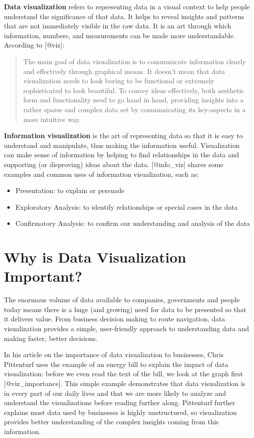 \documentclass[]{book}
\providecommand{\tightlist}{%
  \setlength{\itemsep}{0pt}\setlength{\parskip}{0pt}}
\theoremstyle{definition}
\theoremstyle{definition}
\theoremstyle{definition}
\theoremstyle{remark}
\begin{document}
\textbf{Data visualization} refers to representing data in a visual
context to help people understand the significance of that data. It
helps to reveal insights and patterns that are not immediately visible
in the raw data. It is an art through which information, numbers, and
measurements can be made more understandable. According to {[}@viz{]}:

\begin{quote}
The main goal of data visualization is to communicate information
clearly and effectively through graphical means. It doesn't mean that
data visualization needs to look boring to be functional or extremely
sophisticated to look beautiful. To convey ideas effectively, both
aesthetic form and functionality need to go hand in hand, providing
insights into a rather sparse and complex data set by communicating its
key-aspects in a more intuitive way.
\end{quote}

\textbf{Information visualization} is the art of representing data so
that it is easy to understand and manipulate, thus making the
information useful. Visualization can make sense of information by
helping to find relationships in the data and supporting (or disproving)
ideas about the data. {[}@info\_viz{]} shares some examples and common
uses of information visualization, such as:

\begin{itemize}
\tightlist
\item
  Presentation: to explain or persuade
\item
  Exploratory Analysis: to identify relationships or special cases in
  the data
\item
  Confirmatory Analysis: to confirm our understanding and analysis of
  the data
\end{itemize}

\section{Why is Data Visualization
Important?}\label{why-is-data-visualization-important}

The enormous volume of data available to companies, governments and
people today means there is a huge (and growing) need for data to be
presented so that it delivers value. From business decision making to
route navigation, data visualization provides a simple, user-friendly
approach to understanding data and making faster, better decisions.

In his article on the importance of data visualization to businesses,
Chris Pittenturf uses the example of an energy bill to explain the
impact of data visualization: before we even read the text of the bill,
we look at the graph first {[}@viz\_importance{]}. This simple example
demonstrates that data visualization is in every part of our daily lives
and that we are more likely to analyze and understand the visualizations
before reading further along. Pittenturf further explains most data used
by businesses is highly unstructured, so visualization provides better
understanding of the complex insights coming from this information.
\end{document}
